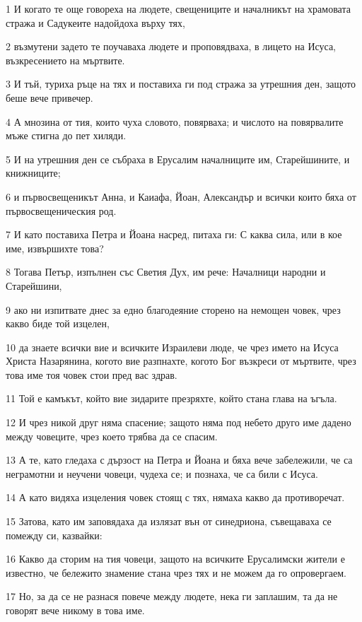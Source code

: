 \par 1 И когато те още говореха на людете, свещениците и началникът на храмовата стража и Садукеите надойдоха върху тях,
\par 2 възмутени задето те поучаваха людете и проповядваха, в лицето на Исуса, възкресението на мъртвите.
\par 3 И тъй, туриха ръце на тях и поставиха ги под стража за утрешния ден, защото беше вече привечер.
\par 4 А мнозина от тия, които чуха словото, повярваха; и числото на повярвалите мъже стигна до пет хиляди.
\par 5 И на утрешния ден се събраха в Ерусалим началниците им, Старейшините, и книжниците;
\par 6 и първосвещеникът Анна, и Каиафа, Йоан, Александър и всички които бяха от първосвещеническия род.
\par 7 И като поставиха Петра и Йоана насред, питаха ги: С каква сила, или в кое име, извършихте това?
\par 8 Тогава Петър, изпълнен със Светия Дух, им рече: Началници народни и Старейшини,
\par 9 ако ни изпитвате днес за едно благодеяние сторено на немощен човек, чрез какво биде той изцелен,
\par 10 да знаете всички вие и всичките Израилеви люде, че чрез името на Исуса Христа Назарянина, когото вие разпнахте, когото Бог възкреси от мъртвите, чрез това име тоя човек стои пред вас здрав.
\par 11 Той е камъкът, който вие зидарите презряхте, който стана глава на ъгъла.
\par 12 И чрез никой друг няма спасение; защото няма под небето друго име дадено между човеците, чрез което трябва да се спасим.
\par 13 А те, като гледаха с дързост на Петра и Йоана и бяха вече забележили, че са неграмотни и неучени човеци, чудеха се; и познаха, че са били с Исуса.
\par 14 А като видяха изцеления човек стоящ с тях, нямаха какво да противоречат.
\par 15 Затова, като им заповядаха да излязат вън от синедриона, съвещаваха се помежду си, казвайки:
\par 16 Какво да сторим на тия човеци, защото на всичките Ерусалимски жители е известно, че бележито знамение стана чрез тях и не можем да го опровергаем.
\par 17 Но, за да се не разнася повече между людете, нека ги заплашим, та да не говорят вече никому в това име.
